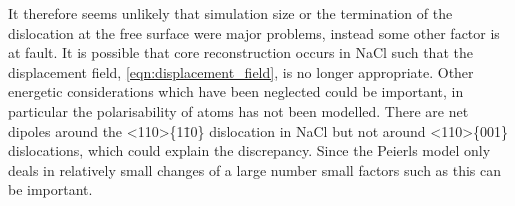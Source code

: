 It therefore seems unlikely that simulation size or the termination of the dislocation at the free surface were major problems, instead some other factor is at fault. It is possible that core reconstruction occurs in NaCl such that the displacement field, \autoref{eqn:displacement_field}, is no longer appropriate. Other energetic considerations which have been neglected could be important, in particular the polarisability of atoms has not been modelled. There are net dipoles around the <110>\{1\={1}0\} dislocation in NaCl but not around <110>\{001\} dislocations, which could explain the discrepancy. Since the Peierls model only deals in relatively small changes of a large number small factors such as this can be important.


























